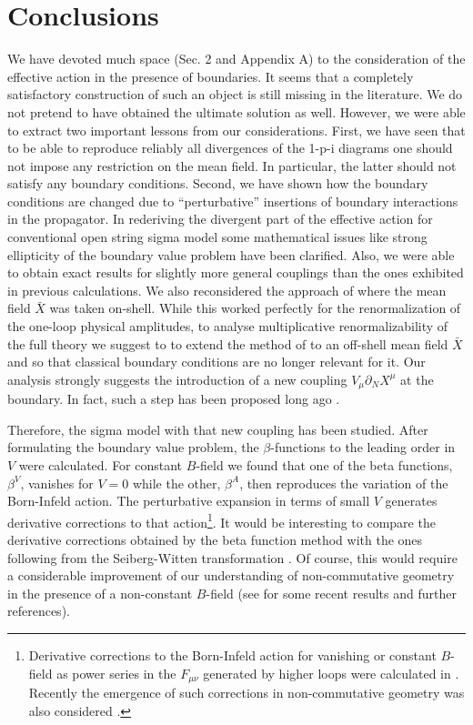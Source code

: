 \documentclass[a4paper,12pt]{article}
\begin{document}
\section{Conclusions}
We have devoted much space (Sec. 2 and Appendix A) to the
consideration of the effective action in the presence
of boundaries. It seems that a completely satisfactory
construction of such an object is still missing in the
literature.  We do not pretend to have obtained  the ultimate
solution as well. However, we were able to  extract two important lessons
from our considerations. First,
we have seen that to be able to reproduce reliably
all divergences of the 1-p-i diagrams one should not
impose any restriction on the mean field. In particular,
the latter should not satisfy any boundary conditions.
Second, we have shown how the boundary conditions are
changed due to ``perturbative'' insertions of boundary
interactions in the propagator. In rederiving
the divergent part of the effective action
for conventional open string sigma model some mathematical
issues like strong ellipticity of the boundary value problem
have been clarified. Also, we were able to obtain exact results
for slightly more general couplings than the ones exhibited
in previous calculations.
We also reconsidered the approach of \cite{Callan88} where
the mean field $\bar X$ was taken on-shell. While this
worked perfectly for the renormalization of the
one-loop physical amplitudes, to analyse multiplicative
renormalizability of the full theory we suggest to
to extend the method of \cite{Callan88}
 to an off-shell mean field $\bar X$ and so that
classical boundary conditions are no longer relevant for it. 
Our analysis strongly suggests the
introduction of a new coupling $V_\mu \partial_N X^\mu$
at the boundary. In fact, such  a step has been proposed
long ago \cite{dornotto86}. 

Therefore, the sigma model with that new
coupling has been studied. After formulating the boundary
value problem,   the $\beta$-functions to the
leading order in $V$ were calculated. 
For constant $B$-field we found that one of the beta functions,
$\beta^V$, vanishes for $V=0$ while the other, $\beta^A$, then reproduces
the variation of the Born-Infeld action. The perturbative expansion
in terms of
small $V$ generates derivative corrections to that action\footnote
{Derivative corrections to the Born-Infeld action for vanishing or constant
$B$-field as power series in the $F_{\mu\nu}$ generated by higher
loops were calculated in \cite{AT1,AT2}. Recently the emergence of such
corrections in non-commutative geometry was also considered
\cite{Okawa00,Cornalba99}.}. 
It would be interesting to compare the derivative
corrections obtained by the beta function method with the ones following
from the Seiberg-Witten transformation \cite{Seiberg99}. 
Of course, this would require a considerable improvement of our
understanding of non-commutative geometry in the presence of a
non-constant $B$-field (see \cite{Ho00} for some recent results
and further references).
\end{document}
